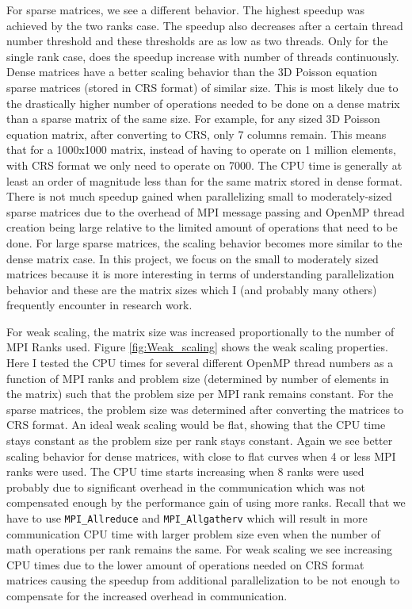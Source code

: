 \documentclass{article}
\begin{document}
For sparse matrices, we see a different behavior. The highest speedup was achieved by the two ranks case. The speedup also decreases after a certain thread number threshold and these thresholds are as low as two threads. Only for the single rank case, does the speedup increase with number of threads continuously. Dense matrices have a better scaling behavior than the 3D Poisson equation sparse matrices (stored in CRS format) of similar size. This is most likely due to the drastically higher number of operations needed to be done on a dense matrix than a sparse matrix of the same size. For example, for any sized 3D Poisson equation matrix, after converting to CRS, only 7 columns remain. This means that for a 1000x1000 matrix, instead of having to operate on 1 million elements, with CRS format we only need to operate on 7000. The CPU time is generally at least an order of magnitude less than for the same matrix stored in dense format. There is not much speedup gained when parallelizing small to moderately-sized sparse matrices due to the overhead of MPI message passing and OpenMP thread creation being large relative to the limited amount of operations that need to be done. For large sparse matrices, the scaling behavior becomes more similar to the dense matrix case. In this project, we focus on the small to moderately sized matrices because it is more interesting in terms of understanding parallelization behavior and these are the matrix sizes which I (and probably many others) frequently encounter in research work.

For weak scaling, the matrix size was increased proportionally to the number of MPI Ranks used. Figure \ref{fig:Weak_scaling} shows the weak scaling properties. Here I tested the CPU times for several different OpenMP thread numbers as a function of MPI ranks and problem size (determined by number of elements in the matrix) such that the problem size per MPI rank remains constant. For the sparse matrices, the problem size was determined after converting the matrices to CRS format. An ideal weak scaling would be flat, showing that the CPU time stays constant as the problem size per rank stays constant. Again we see better scaling behavior for dense matrices, with close to flat curves when 4 or less MPI ranks were used. The CPU time starts increasing when 8 ranks were used probably due to significant overhead in the communication which was not compensated enough by the performance gain of using more ranks. Recall that we have to use \texttt{MPI\_Allreduce} and \texttt{MPI\_Allgatherv} which will result in more communication CPU time with larger problem size even when the number of math operations per rank remains the same. For weak scaling we see increasing CPU times due to the lower amount of operations needed on CRS format matrices causing the speedup from additional parallelization to be not enough to compensate for the increased overhead in communication.
\end{document}
